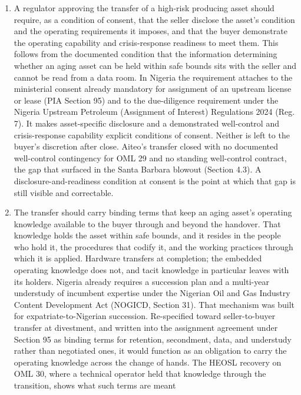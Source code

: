 \begin{enumerate}
\def\labelenumi{\arabic{enumi}.}
\item
  A regulator approving the transfer of a high-risk producing asset
  should require, as a condition of consent, that the seller disclose
  the asset's condition and the operating requirements it imposes, and
  that the buyer demonstrate the operating capability and
  crisis-response readiness to meet them. This follows from the
  documented condition that the information determining whether an aging
  asset can be held within safe bounds sits with the seller and cannot
  be read from a data room. In Nigeria the requirement attaches to the
  ministerial consent already mandatory for assignment of an upstream
  license or lease (PIA Section 95) and to the due-diligence requirement
  under the Nigeria Upstream Petroleum (Assignment of Interest)
  Regulations 2024 (Reg. 7). It makes asset-specific disclosure and a
  demonstrated well-control and crisis-response capability explicit
  conditions of consent. Neither is left to the buyer's discretion after
  close. Aiteo's transfer closed with no documented well-control
  contingency for OML 29 and no standing well-control contract, the gap
  that surfaced in the Santa Barbara blowout (Section 4.3). A
  disclosure-and-readiness condition at consent is the point at which
  that gap is still visible and correctable.
\item
  The transfer should carry binding terms that keep an aging asset's
  operating knowledge available to the buyer through and beyond the
  handover. That knowledge holds the asset within safe bounds, and it
  resides in the people who hold it, the procedures that codify it, and
  the working practices through which it is applied. Hardware transfers
  at completion; the embedded operating knowledge does not, and tacit
  knowledge in particular leaves with its holders. Nigeria already
  requires a succession plan and a multi-year understudy of incumbent
  expertise under the Nigerian Oil and Gas Industry Content Development
  Act (NOGICD, Section 31). That mechanism was built for
  expatriate-to-Nigerian succession. Re-specified toward seller-to-buyer
  transfer at divestment, and written into the assignment agreement
  under Section 95 as binding terms for retention, secondment, data, and
  understudy rather than negotiated ones, it would function as an
  obligation to carry the operating knowledge across the change of
  hands. The HEOSL recovery on OML 30, where a technical operator held
  that knowledge through the transition, shows what such terms are meant

\end{enumerate}
